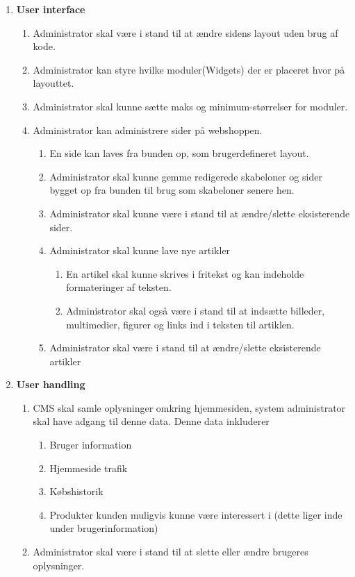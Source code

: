 \begin{enumerate}
\item\textbf{User interface}
	\begin{enumerate}
	\item Administrator skal være i stand til at ændre sidens layout uden brug af kode.
	\item Administrator kan styre hvilke moduler(Widgets) der er placeret hvor på layouttet.
	\item Administrator skal kunne sætte maks og minimum-størrelser for moduler.
	\item Administrator kan administrere sider på webshoppen.
		\begin{enumerate}
	    \item En side kan laves fra bunden op, som brugerdefineret layout.
		\item Administrator skal kunne gemme redigerede skabeloner og sider bygget op fra bunden til brug som skabeloner senere hen.
		\item Administrator skal kunne være i stand til at ændre/slette eksisterende sider.
		\item Administrator skal kunne lave nye artikler
	    	\begin{enumerate}
			\item En artikel skal kunne skrives i fritekst og kan indeholde formateringer af teksten.
			\item Administrator skal også være i stand til at indsætte billeder, multimedier, figurer og links ind i teksten til artiklen.
	    	\end{enumerate}
		\item Administrator skal være i stand til at ændre/slette eksisterende artikler
	\end{enumerate}
	\end{enumerate}

\item\textbf{User handling}
	\begin{enumerate}
	\item CMS skal samle oplysninger omkring hjemmesiden, system administrator skal have adgang til denne data.
	Denne data inkluderer
		\begin{enumerate}
		\item Bruger information
		\item Hjemmeside trafik
		\item Købshistorik
		\item Produkter kunden muligvis kunne være interessert i (dette liger inde under brugerinformation)
		\end{enumerate}
	\item Administrator skal være i stand til at slette eller ændre brugeres oplysninger.
	\end{enumerate}


\end{enumerate}
